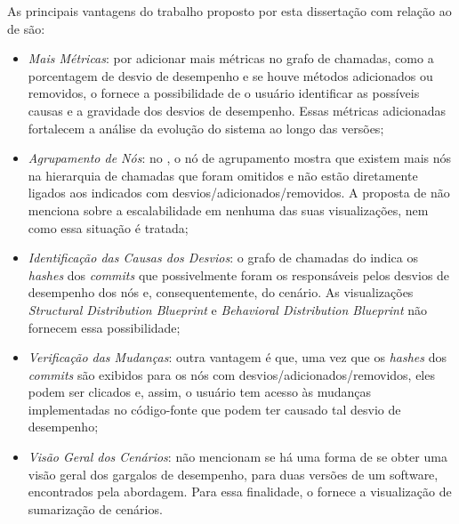 As principais vantagens do trabalho proposto por esta dissertação com relação ao de \citeauthor{Bergel} são:
\begin{itemize}
   \item \textit{Mais Métricas}: por adicionar mais métricas no grafo de chamadas, como a porcentagem de desvio de desempenho e se houve métodos adicionados ou removidos, o {\textit{\toolName}} fornece a possibilidade de o usuário identificar as possíveis causas e a gravidade dos desvios de desempenho. Essas métricas adicionadas fortalecem a análise da evolução do sistema ao longo das versões;
   \item \textit{Agrupamento de Nós}: no {\textit{\toolName}}, o nó de agrupamento mostra que existem mais nós na hierarquia de chamadas que foram omitidos e não estão diretamente ligados aos indicados com desvios/adicionados/removidos. A proposta de \citeauthor{Bergel} não menciona sobre a escalabilidade em nenhuma das suas visualizações, nem como essa situação é tratada;
   \item \textit{Identificação das Causas dos Desvios}: o grafo de chamadas do {\textit{\toolName}} indica os \textit{hashes} dos \textit{commits} que possivelmente foram os responsáveis pelos desvios de desempenho dos nós e, consequentemente, do cenário. As visualizações \textit{Structural Distribution Blueprint} e \textit{Behavioral Distribution Blueprint} não fornecem essa possibilidade;
   \item \textit{Verificação das Mudanças}: outra vantagem é que, uma vez que os \textit{hashes} dos \textit{commits} são exibidos para os nós com desvios/adicionados/removidos, eles podem ser clicados e, assim, o usuário tem acesso às mudanças implementadas no código-fonte que podem ter causado tal desvio de desempenho;
   \item \textit{Visão Geral dos Cenários}: \citeauthor{Bergel} não mencionam se há uma forma de se obter uma visão geral dos gargalos de desempenho, para duas versões de um software, encontrados pela abordagem. Para essa finalidade, o {\textit{\toolName}} fornece a visualização de sumarização de cenários.
\end{itemize}

